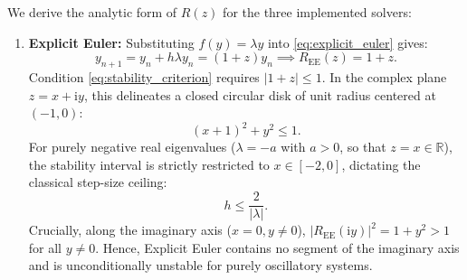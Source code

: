 We derive the analytic form of $R(z)$ for the three implemented solvers:
\begin{enumerate}
    \item \textbf{Explicit Euler:} Substituting $f(y) = \lambda y$ into \eqref{eq:explicit_euler} gives:
    \begin{equation}
    \label{eq:R_EE}
    y_{n+1} = y_n + h\lambda y_n = (1 + z) y_n \implies R_{\mathrm{EE}}(z) = 1 + z.
    \end{equation}
    Condition \eqref{eq:stability_criterion} requires $|1 + z| \le 1$. In the complex plane $z = x + \mathrm{i}y$, this delineates a closed circular disk of unit radius centered at $(-1, 0)$:
    \begin{equation}
    \label{eq:EE_boundary}
    (x + 1)^2 + y^2 \le 1.
    \end{equation}
    For purely negative real eigenvalues ($\lambda = -a$ with $a > 0$, so that $z=x\in\mathbb{R}$), the stability interval is strictly restricted to $x \in [-2, 0]$, dictating the classical step-size ceiling:
    \begin{equation}
    \label{eq:h_crit_EE}
    h \le \frac{2}{|\lambda|}.
    \end{equation}
    Crucially, along the imaginary axis ($x = 0, y \ne 0$), $|R_{\mathrm{EE}}(\mathrm{i}y)|^2 = 1 + y^2 > 1$ for all $y \ne 0$. Hence, Explicit Euler contains no segment of the imaginary axis and is unconditionally unstable for purely oscillatory systems.


\end{enumerate}
